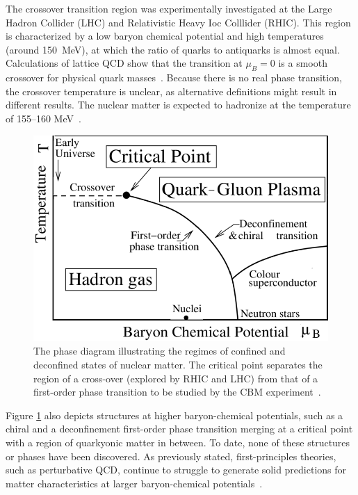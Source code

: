 The crossover transition region was experimentally investigated at the Large Hadron Collider (\gls{LHC}) and Relativistic Heavy Ioc Colllider (\gls{RHIC}). This region is characterized by a low baryon chemical potential and high temperatures (around 150~MeV), at which the ratio of quarks to antiquarks is almost equal. Calculations of lattice \gls{QCD} show that the transition at $\mu_{B} = 0$ is a smooth crossover for
physical quark masses~\cite{Aoki_2006}. Because there is no real phase transition, the crossover temperature is unclear, as alternative definitions might result in different results. The nuclear matter is expected to hadronize at the temperature of 155--160 MeV~\cite{Bazavov_2012, Stachel_2014}.



\begin{figure}[!h]
\centering
 \includegraphics[width=0.65\columnwidth]{Chapter1/images/phase.png}
\caption{The phase diagram illustrating the regimes of confined and deconfined states of nuclear matter. The critical point separates the region of a cross-over (explored by \gls{RHIC} and \gls{LHC}) from that of a first-order phase transition to be studied by the CBM experiment~\cite{friese_diagram}.}
\label{fig_phase}
\end{figure}
\newpage
Figure \ref{fig_phase} also depicts structures at higher baryon-chemical potentials, such as a chiral and a deconfinement first-order phase transition merging at a critical point with a region of quarkyonic matter in between. To date, none of these structures or phases have been discovered. As previously stated, first-principles theories, such as perturbative QCD, continue to struggle to generate solid predictions for matter characteristics at larger baryon-chemical potentials~\cite{Sakai_2008, Fischer_01, Tawfik_01}. 



